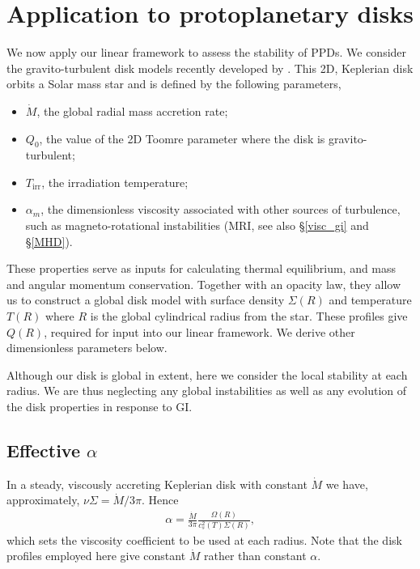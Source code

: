 \section{Application to protoplanetary disks}\label{2dppd}
We now apply our linear framework to assess the stability of  
PPDs. We consider the gravito-turbulent disk models recently
developed by \citet[][hereafter ]{rafikov15}. 
This 2D, Keplerian disk orbits a Solar 
mass star and is defined by the following parameters, 

\begin{itemize}
  \item $\dot{M}$, the global radial mass accretion rate;
  \item $Q_0$, the value of the 2D Toomre parameter where the disk is
    gravito-turbulent;
  \item $T_\mathrm{irr}$, the irradiation temperature;
  \item $\alpha_m$, the dimensionless viscosity associated with other
    sources of turbulence, such as magneto-rotational instabilities
    (MRI, see also \S\ref{visc_gi} and \S\ref{MHD}). 
\end{itemize} 
These properties serve as inputs for calculating thermal equilibrium, and mass and
angular momentum conservation. Together with an opacity law, 
they allow us to construct a global disk model with surface density $\Sigma(R)$ and
temperature $T(R)$ where $R$ is the global cylindrical radius from the
star.  These profiles give $Q(R)$,
required for input into our linear framework. We derive other
dimensionless parameters below. 

Although our disk is global in extent, here we consider the local
stability at each radius. We are thus neglecting any global
instabilities \citep{adams89,lodato05,kratter10} as well as any
evolution of the disk properties in response to GI. 
 

\subsection{Effective $\alpha$}
In a steady, viscously accreting Keplerian disk 
with constant $\dot{M}$ we have,
approximately, $\nu\Sigma = \dot{M}/3\pi$. Hence
\begin{align}
  \alpha = \frac{\dot{M}}{3\pi}\frac{\Omega(R)}{c_{s}^2(T)\Sigma(R)},  
\end{align} 
which sets the viscosity coefficient to be used at each radius. Note that the disk profiles 
employed here give constant $\dot{M}$ rather than constant $\alpha$.

